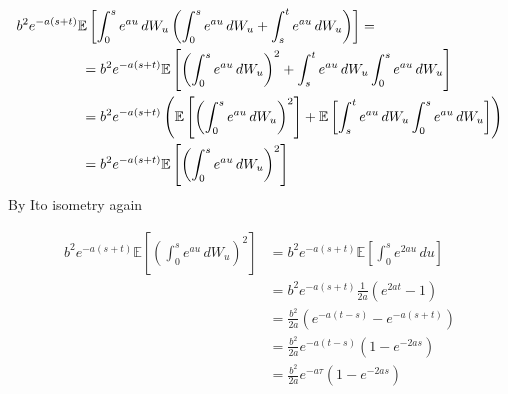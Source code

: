\documentclass[a4paper,12pt]{article} %
\begin{document}
\begin{align*}
    b^2 e^{-a(s+t)} \mathbb{E} \left[ \int_0^{s} e^{au} \, dW_u \left( \int_0^s e^{au} \, dW_u + \int_s^t e^{au} \, dW_u \right) \right] & =                                                                                                                                                                                                    \\
                                                                                                                                         & \hspace{-7cm}= b^2 e^{-a(s+t)} \mathbb{E} \left[ \left(  \int_0^s e^{au} \, dW_u \right) ^2 + \int_s^t e^{au} \, dW_u  \int_0^{s} e^{au} \, dW_u  \right]                                            \\
                                                                                                                                         & \hspace{-7cm}= b^2 e^{-a(s+t)} \left(  \mathbb{E} \left[ \left(  \int_0^s e^{au} \, dW_u \right) ^2\right] +  \mathbb{E} \left[ \int_s^t e^{au} \, dW_u  \int_0^{s} e^{au} \, dW_u  \right]  \right) \\
                                                                                                                                         & \hspace{-7cm}= b^2 e^{-a(s+t)} \mathbb{E} \left[ \left(  \int_0^s e^{au} \, dW_u \right) ^2\right]                                                                                                   \\
\end{align*}
By Ito isometry again

\begin{align*}
    b^2 e^{-a(s+t)} \mathbb{E} \left[ \left(  \int_0^s e^{au} \, dW_u \right) ^2\right] & = b^2 e^{-a(s+t)} \mathbb{E} \left[\int_0^s e^{2au} \, du \right] \\
                                                                                        & =b^2 e^{-a(s+t)} \frac{1}{2a}\left( e^{2at}-1 \right)             \\
                                                                                        & = \frac{b^{2} }{2a}\left( e^{-a(t-s)} - e^{-a(s+t)} \right)       \\
                                                                                        & = \frac{b^2}{2a} e^{-a(t-s)} \left( 1-e^{-2as} \right)            \\
                                                                                        & = \frac{b^2}{2a} e^{-a \tau } \left( 1-e^{-2as} \right)
\end{align*}
\end{document}
